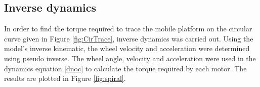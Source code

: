 {\subsection{Inverse dynamics}
\label{sec:InvDynamics_NoSlip}
In order to find the torque required to trace the mobile platform on the circular curve given in Figure \ref{fig:CirTrace}, inverse dynamics was carried out.
Using the model's inverse kinematic,  the wheel velocity and acceleration were determined using pseudo inverse.  %
The wheel angle, velocity and acceleration were used in the dynamics equation \ref{dnoc}  to calculate the torque required by each motor. The results are plotted in Figure \ref{fig:spiral}. 

}
